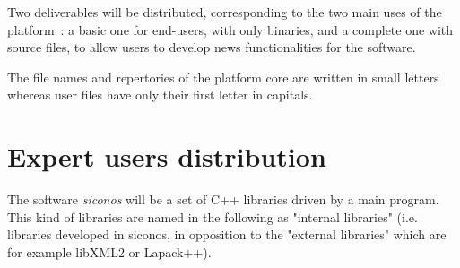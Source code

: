
%

%



Two deliverables will be distributed, corresponding to the two main uses of the platform~: a basic one for end-users, with only binaries, and a complete one with source files, to allow users to develop news functionalities for the software.

The file names and repertories of the platform core are written in small letters whereas user files have only their first letter in capitals. \\

\section{Expert users distribution}
\label{dudev}

The software \textit{siconos} will be a set of C++ libraries driven by a main program. This kind of libraries are named in the following as "internal libraries" (i.e. libraries developed in \ac{siconos}, in opposition to the "external libraries" which are for example libXML2 or Lapack++). \\

